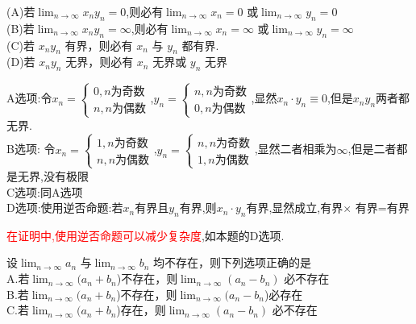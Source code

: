 \documentclass[8pt a4paper, oneside, UTF8]{ctexbook}
\begin{document}
\begin{sloppypar}
\begin{problem}
        (A)若$\lim_{n\to\infty} x_ny_n=0$,则必有$\lim_{n\to\infty} x_n=0$ 或$\lim_{n\to\infty} y_n=0$\\
        (B)若$\lim_{n\to\infty} x_ny_n=\infty$,则必有$\lim_{n\to\infty} x_n=\infty$ 或$\lim_{n\to\infty}y_n=\infty$\\
        (C)若 $x_ny_n$ 有界，则必有 $x_n$ 与 $y_n$ 都有界.\\
        (D)若 $x_ny_n$ 无界，则必有 $x_n$ 无界或 $y_n$ 无界
    \end{problem}
    \begin{solution}
        A选项:令$x_n=\begin{cases}
            0, n\text{为奇数}\\
            n,n\text{为偶数}
        \end{cases}$,$y_n=\begin{cases}
            n,n\text{为奇数}\\
            0, n\text{为偶数}
        \end{cases}$,显然$x_n \cdot y_n \equiv 0$,但是$x_n y_n$两者都无界.\\
        B选项: 令$x_n=\begin{cases}
            1,n\text{为奇数}\\
            n,n\text{为偶数}
        \end{cases}$,$y_n=\begin{cases}
            n,n\text{为奇数}\\            
            1,n\text{为偶数}
        \end{cases}$,显然二者相乘为$\infty$,但是二者都是无界,没有极限\\
        C选项:同A选项\\
        D选项:使用逆否命题:若$x_n$有界且$y_n$有界,则$x_n \cdot y_n$有界,显然成立,有界$\times$ 有界=有界
    \end{solution}
    \begin{note}
       \textcolor{red}{在证明中,使用逆否命题可以减少复杂度},如本题的D选项.
    \end{note}
    \begin{problem}
        设$\lim_{n\to\infty} a_n$ 与$\lim_{n\to\infty} b_n$ 均不存在，则下列选项正确的是\\
        A.若$\lim_{n \to \infty}(a_n+b_n$)不存在，则$\lim_{n \to \infty}(a_n-b_n)$ 必不存在 \\ 
        B.若$\lim_{n \to \infty}(a_n+b_n$)不存在，则$\lim_{n \to \infty}(a_n-b_n$)必存在\\
        C.若$\lim_{n \to \infty}(a_n+b_n$)存在，则$\lim_{n \to \infty}(a_n-b_n)$ 必不存在 \\ 

\end{problem}
\end{sloppypar}
\end{document}
